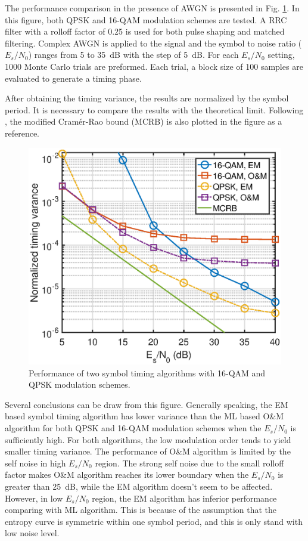 \documentclass[journal,comsoc]{IEEEtran}
\begin{document}
The performance comparison in the presence of AWGN is presented in Fig. \ref{fig:timing_per}.
In this figure, both QPSK and 16-QAM modulation schemes are tested.
A RRC filter with a rolloff factor of 0.25 is used for both pulse shaping and matched filtering.
Complex AWGN is applied to the signal and the symbol to noise ratio (\(E_s/N_0\)) ranges from 5 to 35~dB with the step of 5~dB.
For each \(E_s/N_0\) setting, 1000 Monte Carlo trials are preformed.
Each trial, a block size of 100 samples are evaluated to generate a timing phase.

After obtaining the  timing variance, the results are normalized by the symbol period.
It is necessary to compare the results with the theoretical limit.
Following \cite{mengali1997synchronization}, the modified Cram\'er-Rao bound (MCRB) is also plotted in the figure as a reference.

\begin{figure}[ht]
\centering
\includegraphics[width=3 in]{pic/per_timing.eps}
\caption{Performance of two symbol timing algorithms with 16-QAM and QPSK modulation schemes.}
\label{fig:timing_per} 
\end{figure}   

Several conclusions can be draw from this figure.
Generally speaking, the EM based symbol timing algorithm has lower variance than the ML based O\&M algorithm for both QPSK and 16-QAM modulation schemes when the  \(E_s/N_0\) is sufficiently high.
For both algorithms, the low modulation order tends to yield smaller timing variance.
The performance of O\&M algorithm is limited by the self noise in high \(E_s/N_0\) region. 
The strong self noise due to the small rolloff factor makes O\&M algorithm reaches its lower boundary when the \(E_s/N_0\) is greater than 25~dB, while the EM  algorithm doesn't seem to be affected.
However, in low \(E_s/N_0\) region, the EM algorithm has inferior performance comparing with ML algorithm.
This is because of the assumption that the entropy curve is symmetric within one symbol period, and this is only stand with low noise level.
\end{document}
